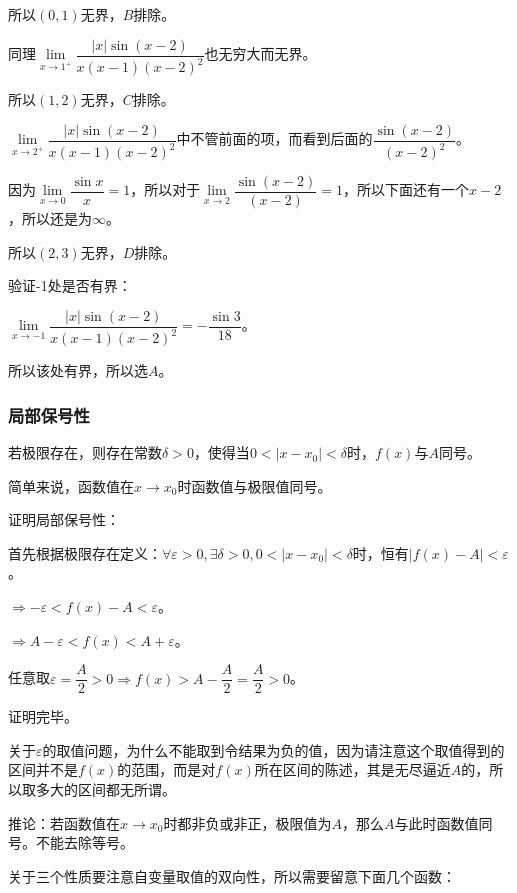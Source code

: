 \documentclass[UTF8, 12pt]{ctexart}
\begin{document}
    所以$(0,1)$无界，$B$排除。\medskip

    同理$\lim\limits_{x\to 1^+}\dfrac{\vert x\vert\sin(x-2)}{x(x-1)(x-2)^2}$也无穷大而无界。\medskip

    所以$(1,2)$无界，$C$排除。\medskip

    $\lim\limits_{x\to 2^+}\dfrac{\vert x\vert\sin(x-2)}{x(x-1)(x-2)^2}$中不管前面的项，而看到后面的$\dfrac{\sin(x-2)}{(x-2)^2}$。\medskip

    因为$\lim\limits_{x\to 0}\dfrac{\sin x}{x}=1$，所以对于$\lim\limits_{x\to 2}\dfrac{\sin(x-2)}{(x-2)}=1$，所以下面还有一个$x-2$，所以还是为$\infty$。

    所以$(2,3)$无界，$D$排除。\medskip

    验证-1处是否有界：\medskip

    $\lim\limits_{x\to -1}\dfrac{\vert x\vert\sin(x-2)}{x(x-1)(x-2)^2}=-\dfrac{\sin 3}{18}$。\medskip

    所以该处有界，所以选$A$。

    \subsubsection{局部保号性}

    若极限存在，则存在常数$\delta>0$，使得当$0<\vert x-x_0\vert<\delta$时，$f(x)$与$A$同号。

    简单来说，函数值在$x\to x_0$时函数值与极限值同号。

    证明局部保号性：

    首先根据极限存在定义：$\forall\varepsilon>0,\exists\delta>0,0<\vert x-x_0\vert<\delta$时，恒有$\vert f(x)-A\vert<\varepsilon$。

    $\Rightarrow -\varepsilon<f(x)-A<\varepsilon$。

    $\Rightarrow A-\varepsilon<f(x)<A+\varepsilon$。

    任意取$\varepsilon=\dfrac{A}{2}>0\Rightarrow f(x)>A-\dfrac{A}{2}=\dfrac{A}{2}>0$。

    证明完毕。

    关于$\varepsilon$的取值问题，为什么不能取到令结果为负的值，因为请注意这个取值得到的区间并不是$f(x)$的范围，而是对$f(x)$所在区间的陈述，其是无尽逼近$A$的，所以取多大的区间都无所谓。

    推论：若函数值在$x\to x_0$时都非负或非正，极限值为$A$，那么$A$与此时函数值同号。不能去除等号。

    \medskip

    关于三个性质要注意自变量取值的双向性，所以需要留意下面几个函数：
\end{document}
